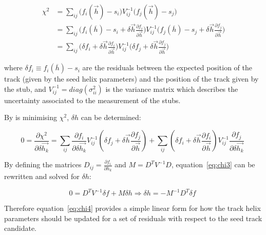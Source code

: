 \begin{equation}
\begin{split}
\chi^{2} &= \sum_{ij} \big(f_{i}(\overrightarrow{h}) - s_{i} \big) V^{-1}_{ij}  \big(f_{j}(\overrightarrow{h}) - s_{j} \big)  \\
         &= \sum_{ij} \big( f_{i}(\overline{h})  - s_{i} + \delta \overrightarrow{h} \frac{\partial f_{i}}{\partial \overrightarrow{h}} \big) V^{-1}_{ij}  \big( f_{j}(\overline{h})  - s_{j} + \delta \overrightarrow{h} \frac{\partial f_{j}}{\partial \overrightarrow{h}} \big)  \\
         &= \sum_{ij} \big( \delta f_{i} + \delta \overrightarrow{h} \frac{\partial f_{i}}{\partial \overrightarrow{h}} \big) V^{-1}_{ij}  \big( \delta f_{j} + \delta \overrightarrow{h} \frac{\partial f_{j}}{\partial \overrightarrow{h}} \big)
\end{split}
\label{eq:chi2}
\end{equation}

where $\delta f_{i} \equiv f_{i}(\overline{h}) - s_{i}$ are the residuals between the expected position of the track (given by the seed helix parameters) and the position of the track given by the stub, and $V^{-1}_{ij} = diag(\sigma^{2}_{ii})$ is the variance matrix which describes the uncertainty associated to the measurement of the stubs.

By is minimising $\chi^{2}$, $\delta h$ can be determined:

\begin{equation}
0 = \frac{\partial \chi^{2}}{\partial \delta \overrightarrow{h_{k}}} = \sum_{ij} \frac{\partial f_{i}}{\partial \delta \overrightarrow{h_{k}}} V^{-1}_{ij} ( \delta f_{j} + \delta \overrightarrow{h} \frac{\partial f_{j}}{\partial \overrightarrow{h}} ) + \sum_{ij}	( \delta f_{i} + \delta \overrightarrow{h} \frac{\partial f_{i}}{\partial \overrightarrow{h}} ) V^{-1}_{ij} \frac{\partial f_{j}}{\partial \delta \overrightarrow{h_{k}}}  \;
\label{eq:chi3}
\end{equation}

By defining the matrices $D_{ij} = \frac{\partial f_{i}}{\partial h_{k}}$ and $M = D^{T} V^{-1} D$, equation~\ref{eq:chi3} can be rewritten and solved for $\delta h$:

\begin{equation}
0 = D^{T} V^{-1} \delta f + M \delta h \Rightarrow \delta h = - M^{-1} D^{T} \delta f \;
\label{eq:chi4}
\end{equation}

Therefore equation~\ref{eq:chi4} provides a simple linear form for how the track helix parameters should be updated for a set of residuals with respect to the seed track candidate.

